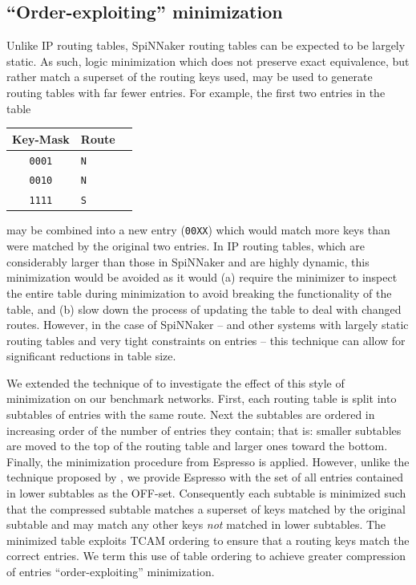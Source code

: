 \documentclass[conference]{IEEEtran}
\newcommand{\mytt}[1]{\texttt{\footnotesize#1}}
\begin{document}
\subsection*{``Order-exploiting'' minimization}

Unlike IP routing tables, SpiNNaker routing tables can be expected to be largely static.
As such, logic minimization which does not preserve exact equivalence, but rather match a superset of the routing keys used, may be used to generate routing tables with far fewer entries.
For example, the first two entries in the table

  \begin{table}[H]
    \centering
    \begin{tabular}{c l l}
      \toprule
      Key-Mask & Route \\
      \midrule
      \texttt{0001} & \texttt{N} \\
      \texttt{0010} & \texttt{N} \\
      \texttt{1111} & \texttt{S} \\
      \bottomrule
    \end{tabular}
  \end{table}

\noindent may be combined into a new entry (\mytt{00XX}) which would match more keys than were matched by the original two entries.
In IP routing tables, which are considerably larger than those in SpiNNaker and are highly dynamic, this minimization would be avoided as it would (a) require the minimizer to inspect the entire table during minimization to avoid breaking the functionality of the table,
and (b) slow down the process of updating the table to deal with changed routes.
However, in the case of SpiNNaker -- and other systems with largely static routing tables and very tight constraints on entries -- this technique can allow for significant reductions in table size.

We extended the technique of \textcite{Liu2002} to investigate the effect of this style of minimization on our benchmark networks.
First, each routing table is split into subtables of entries with the same route.
Next the subtables are ordered in increasing order of the number of entries they contain; that is: smaller subtables are moved to the top of the routing table and larger ones toward the bottom.
Finally, the minimization procedure from Espresso is applied.
However, unlike the technique proposed by \textcite{Liu2002}, we provide Espresso with the set of all entries contained in lower subtables as the OFF-set.
Consequently each subtable is minimized such that the compressed subtable matches a superset of keys matched by the original subtable and may match any other keys \textit{not} matched in lower subtables.
The minimized table exploits TCAM ordering to ensure that a routing keys match the correct entries.
We term this use of table ordering to achieve greater compression of entries ``order-exploiting'' minimization.
\end{document}
